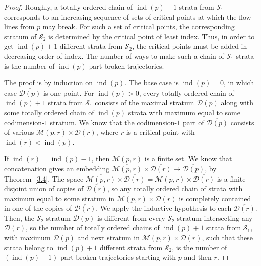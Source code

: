 \documentclass[psamsfonts]{amsart}
\theoremstyle{remark}
\DeclareMathOperator{\ind}{ind}
\begin{document}
\begin{proof}
Roughly, a totally ordered chain of $\ind(p) + 1$ strata from $\mathcal{S}_1$ corresponds to an increasing sequence of sets of critical points at which the flow lines from $p$ may break.  For such a set of critical points, the corresponding stratum of $\mathcal{S}_2$ is determined by the critical point of least index.  Thus, in order to get $\ind(p) + 1$ different strata from $\mathcal{S}_2$, the critical points must be added in decreasing order of index.  The number of ways to make such a chain of $\mathcal{S}_1$-strata is the number of $\ind(p)$-part broken trajectories.

The proof is by induction on $\ind(p)$.  The base case is $\ind(p) = 0$, in which case $\overline{\mathcal{D}(p)}$ is one point.  For $\ind(p) > 0$, every totally ordered chain of $\ind(p) + 1$ strata from $\mathcal{S}_1$ consists of the maximal stratum $\mathcal{D}(p)$ along with some totally ordered chain of $\ind(p)$ strata with maximum equal to some codimension-$1$ stratum.  We know that the codimension-$1$ part of $\overline{\mathcal{D}(p)}$ consists of various $\mathcal{M}(p, r) \times \mathcal{D}(r)$, where $r$ is a critical point with $\ind(r) < \ind(p)$.

If $\ind(r) = \ind(p) - 1$, then $\mathcal{M}(p, r)$ is a finite set.  We know that concatenation gives an embedding $\overline{\mathcal{M}(p, r)} \times \overline{\mathcal{D}(r)} \rightarrow \overline{\mathcal{D}(p)}$, by Theorem~\ref{3.4}.  The space $\overline{\mathcal{M}(p, r)} \times \overline{\mathcal{D}(r)} = \mathcal{M}(p, r) \times \overline{\mathcal{D}(r)}$ is a finite disjoint union of copies of $\overline{\mathcal{D}(r)}$, so any totally ordered chain of strata with maximum equal to some stratum in $\mathcal{M}(p, r) \times \mathcal{D}(r)$ is completely contained in one of the copies of $\overline{\mathcal{D}(r)}$.  We apply the inductive hypothesis to each $\overline{\mathcal{D}(r)}$.  Then, the $\mathcal{S}_2$-stratum $\mathcal{D}(p)$ is different from every $\mathcal{S}_2$-stratum intersecting any $\overline{\mathcal{D}(r)}$, so the number of totally ordered chains of $\ind(p) + 1$ strata from $\mathcal{S}_1$, with maximum $\mathcal{D}(p)$ and next stratum in $\mathcal{M}(p, r) \times \mathcal{D}(r)$, such that these strata belong to $\ind(p) + 1$ different strata from $\mathcal{S}_2$, is the number of $(\ind(p) + 1)$-part broken trajectories starting with $p$ and then $r$.


\end{proof}
\end{document}
